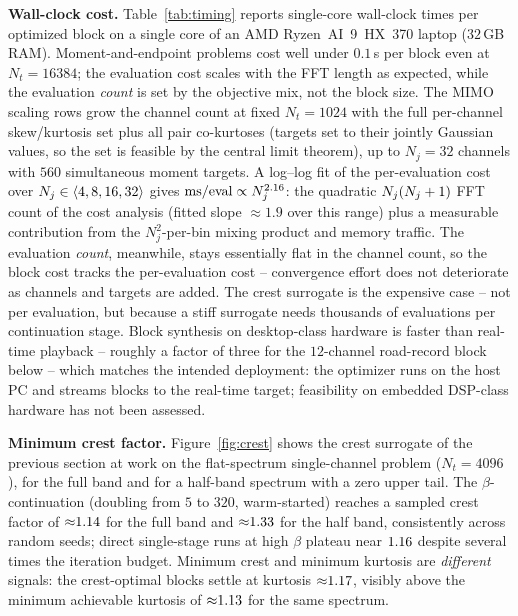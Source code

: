 \documentclass[10pt,a4paper]{article}
\numberwithin{equation}{section}
\DeclarePairedDelimiter\seq{\langle}{\rangle}
\DeclarePairedDelimiter\mat{(}{)}
\newcommand{\m}[1]{\mathrm{#1}}
\begin{document}
\textbf{Wall-clock cost.} Table~\ref{tab:timing} reports single-core wall-clock times per optimized block on a single core of an AMD Ryzen~AI~9~HX~370 laptop ($32\,$GB RAM). Moment-and-endpoint problems cost well under $0.1\,$s per block even at $N_t = 16384$; the evaluation cost scales with the FFT length as expected, while the evaluation \emph{count} is set by the objective mix, not the block size. The MIMO scaling rows grow the channel count at fixed $N_t = 1024$ with the full per-channel skew/kurtosis set plus all pair co-kurtoses (targets set to their jointly Gaussian values, so the set is feasible by the central limit theorem), up to $N_j = 32$ channels with $560$ simultaneous moment targets. A log--log fit of the per-evaluation cost over $N_j \in \seq{4, 8, 16, 32}$ gives ${\m{ms/eval} \propto N_j^{\scalingslope}}$: the quadratic $N_j\mat{N_j+1}$ FFT count of the cost analysis (fitted slope ${\approx}1.9$ over this range) plus a measurable contribution from the $N_j^2$-per-bin mixing product and memory traffic. The evaluation \emph{count}, meanwhile, stays essentially flat in the channel count, so the block cost tracks the per-evaluation cost -- convergence effort does not deteriorate as channels and targets are added. The crest surrogate is the expensive case -- not per evaluation, but because a stiff surrogate needs thousands of evaluations per continuation stage. Block synthesis on desktop-class hardware is faster than real-time playback -- roughly a factor of three for the $12$-channel road-record block below -- which matches the intended deployment: the optimizer runs on the host PC and streams blocks to the real-time target; feasibility on embedded DSP-class hardware has not been assessed.

\begin{table}[htb]
\centering

\caption{Wall-clock cost per optimized block (single core, AMD Ryzen AI 9 HX 370). ``Evals'' counts objective/gradient evaluations to the stop criterion of the corresponding example; the MIMO scaling rows use per-channel skew/kurtosis plus all pair co-kurtoses at their jointly Gaussian values.}
\label{tab:timing}
\end{table}

\textbf{Minimum crest factor.} Figure~\ref{fig:crest} shows the crest surrogate of the previous section at work on the flat-spectrum single-channel problem ($N_t = 4096$), for the full band and for a half-band spectrum with a zero upper tail. The $\beta$-continuation (doubling from $5$ to $320$, warm-started) reaches a sampled crest factor of ${\approx}1.14$ for the full band and ${\approx}1.33$ for the half band, consistently across random seeds; direct single-stage runs at high $\beta$ plateau near $1.16$ despite several times the iteration budget. Minimum crest and minimum kurtosis are \emph{different} signals: the crest-optimal blocks settle at kurtosis ${\approx}1.17$, visibly above the minimum achievable kurtosis of ${\approx}1.13$ for the same spectrum.
\end{document}

